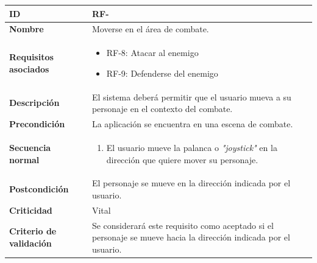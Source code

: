 \begin{center}
	\begin{tabular}{ | p{4.7cm} | p{10cm} | } 
		\hline
		
		\textbf{ID} & RF-\arabic{contador_requisitos_funcionales}
		{contador_requisitos_funcionales} \\
		
		\hline 
		\textbf{Nombre} &
		Moverse en el área de combate.\\ 
		
		\hline
		\textbf{Requisitos asociados} & 
		\begin{itemize}
			\item RF-8: Atacar al enemigo
			\item RF-9: Defenderse del enemigo
		\end{itemize}\\
		
		\hline
		\textbf{Descripción} & 
		El sistema deberá permitir que el usuario mueva a su personaje en el contexto del combate.\\
		
		\hline
		\textbf{Precondición} & 
		La aplicación se encuentra en una escena de combate.\\
		
		\hline
		\textbf{Secuencia normal} &
		\begin{enumerate}
			\item El usuario mueve la palanca o \textit{"joystick"} en la dirección que quiere mover su personaje.
		\end{enumerate}
		\\
		
		\hline
		\textbf{Postcondición} & 
		El personaje se mueve en la dirección indicada por el usuario.\\
		
		\hline 
		\textbf{Criticidad} &
		Vital\\
		
		\hline 
		\textbf{Criterio de validación} & 
		Se considerará este requisito como aceptado si el personaje se mueve hacia la dirección indicada por el usuario.\\
		
		\hline
	\end{tabular}
\end{center}

